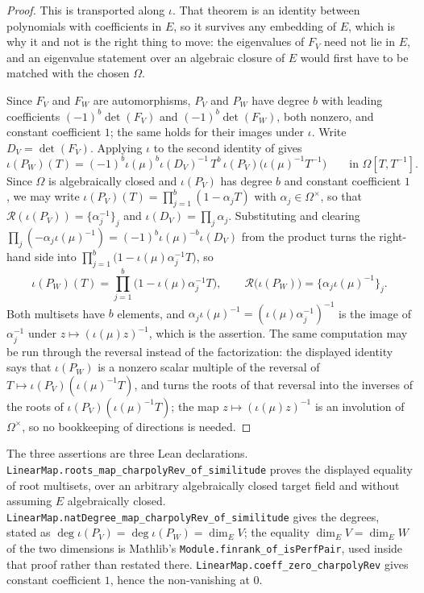 \begin{proof}
\leanok
This is  transported along $\iota$.  That
theorem is an identity between polynomials with coefficients in $E$, so it
survives any embedding of $E$, which is why it and not
 is the right thing to move: the
eigenvalues of $F_V$ need not lie in $E$, and an eigenvalue statement over an
algebraic closure of $E$ would first have to be matched with the chosen
$\Omega$.

Since $F_V$ and $F_W$ are automorphisms, $P_V$ and $P_W$ have degree $b$ with
leading coefficients $(-1)^b\det(F_V)$ and $(-1)^b\det(F_W)$, both nonzero,
and constant coefficient $1$; the same holds for their images under $\iota$.
Write $D_V=\det(F_V)$.  Applying $\iota$ to the second identity of
 gives
\[
  \iota(P_W)(T)
  =(-1)^b\iota(\mu)^b\iota(D_V)^{-1}\,T^b\,
   \iota(P_V)\bigl(\iota(\mu)^{-1}T^{-1}\bigr)
  \qquad\text{in }\Omega[T,T^{-1}].
\]
Since $\Omega$ is algebraically closed and $\iota(P_V)$ has degree $b$ and
constant coefficient $1$, we may write
$\iota(P_V)(T)=\prod_{j=1}^b(1-\alpha_jT)$ with $\alpha_j\in\Omega^\times$,
so that $\mathcal R(\iota(P_V))=\{\alpha_j^{-1}\}_j$ and
$\iota(D_V)=\prod_j\alpha_j$.  Substituting and clearing
$\prod_j(-\alpha_j\iota(\mu)^{-1})=(-1)^b\iota(\mu)^{-b}\iota(D_V)$ from the
product turns the right-hand side into
$\prod_{j=1}^b\bigl(1-\iota(\mu)\alpha_j^{-1}T\bigr)$, so
\[
  \iota(P_W)(T)=\prod_{j=1}^b\bigl(1-\iota(\mu)\alpha_j^{-1}T\bigr),
  \qquad
  \mathcal R\bigl(\iota(P_W)\bigr)
  =\bigl\{\alpha_j\iota(\mu)^{-1}\bigr\}_j .
\]
Both multisets have $b$ elements, and
$\alpha_j\iota(\mu)^{-1}=(\iota(\mu)\alpha_j^{-1})^{-1}$ is the image of
$\alpha_j^{-1}$ under $z\mapsto(\iota(\mu)z)^{-1}$, which is the assertion.
The same computation may be run through the reversal instead of the
factorization: the displayed identity says that $\iota(P_W)$ is a nonzero
scalar multiple of the reversal of $T\mapsto\iota(P_V)(\iota(\mu)^{-1}T)$, and
 turns the roots of that reversal into the
inverses of the roots of $\iota(P_V)(\iota(\mu)^{-1}T)$; the map
$z\mapsto(\iota(\mu)z)^{-1}$ is an involution of $\Omega^\times$, so no
bookkeeping of directions is needed.
\end{proof}

The three assertions are three Lean declarations.
\texttt{LinearMap.roots\_map\_charpolyRev\_of\_similitude} proves the displayed
equality of root multisets, over an arbitrary algebraically closed target
field and without assuming $E$ algebraically closed.
\texttt{LinearMap.natDegree\_map\_charpolyRev\_of\_similitude} gives the
degrees, stated as $\deg\iota(P_V)=\deg\iota(P_W)=\dim_EV$; the equality
$\dim_EV=\dim_EW$ of the two dimensions is Mathlib's
\texttt{Module.finrank\_of\_isPerfPair}, used inside that proof rather than
restated there.  \texttt{LinearMap.coeff\_zero\_charpolyRev} gives constant
coefficient $1$, hence the non-vanishing at $0$.

